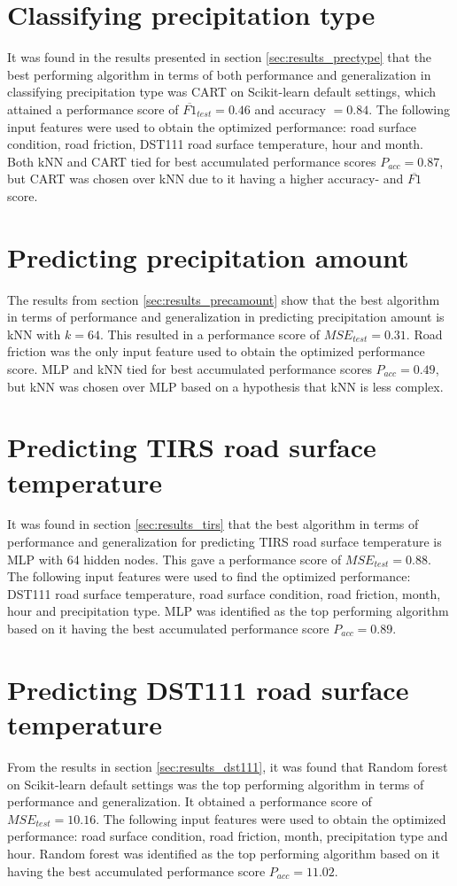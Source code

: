 	\section{Classifying precipitation type}
	It was found in the results presented in section \ref{sec:results_prectype} that the best performing algorithm in terms of both performance and generalization in classifying precipitation type was CART on Scikit-learn default settings, which attained a performance score of $\overline{F1}_{test}=0.46$ and accuracy $=0.84$. The following input features were used to obtain the optimized performance:  road surface condition, road friction, DST111 road surface temperature, hour and month. Both kNN and CART tied for best accumulated performance scores $P_{acc} = 0.87$, but CART was chosen over kNN due to it having a higher accuracy- and $\overline{F1}$ score. 

	\section{Predicting precipitation amount}
	The results from section \ref{sec:results_precamount} show that the best algorithm in terms of performance and generalization in predicting precipitation amount is kNN with $k=64$. This resulted in a performance score of $MSE_{test} = 0.31$. Road friction was the only input feature used to obtain the optimized performance score. MLP and kNN tied for best accumulated performance scores $P_{acc} = 0.49$, but kNN was chosen over MLP based on a hypothesis that kNN is less complex. 

	\section{Predicting TIRS road surface temperature}
	It was found in section \ref{sec:results_tirs} that the best algorithm in terms of performance and generalization for predicting TIRS road surface temperature is MLP with 64 hidden nodes. This gave a performance score of $MSE_{test} = 0.88$. The following input features were used to find the optimized performance: DST111 road surface temperature, road surface condition, road friction, month, hour and precipitation type. MLP was identified as the top performing algorithm based on it having the best accumulated performance score $P_{acc} = 0.89$. 

	\section{Predicting DST111 road surface temperature}

	From the results in section \ref{sec:results_dst111}, it was found that Random forest on Scikit-learn default settings was the top performing algorithm in terms of performance and generalization. It obtained a performance score of $MSE_{test} = 10.16$. The following input features were used to obtain the optimized performance: road surface condition, road friction, month, precipitation type and hour. Random forest was identified as the top performing algorithm based on it having the best accumulated performance score $P_{acc} = 11.02$. 
	
